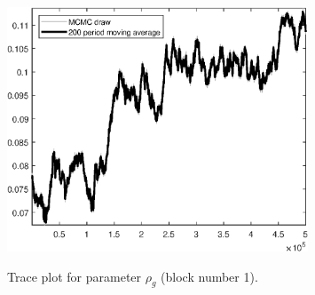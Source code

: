 \begin{figure}[H]
\centering
  \includegraphics[width=0.8\textwidth]{BRS_growth_ext_fd/graphs/TracePlot_rho_g_blck_1}\\
    \caption{Trace plot for parameter ${\rho_g}$ (block number 1).}
\end{figure}
